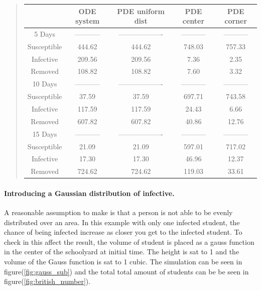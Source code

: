 \documentclass[%
twoside,                 %
final,                   %
10pt]{article}
\begin{document}
\begin{quote}
\begin{tabular}{ccccc}
\hline
\multicolumn{1}{c}{  } & \multicolumn{1}{c}{ ODE system } & \multicolumn{1}{c}{ PDE uniform dist } & \multicolumn{1}{c}{ PDE center } & \multicolumn{1}{c}{ PDE corner } \\
\hline
5 Days              & -----------         & ------------------- & -----------         & -----------         \\
\hline
Susceptible         & 444.62              & 444.62              & 748.03              & 757.33              \\
Infective           & 209.56              & 209.56              & 7.36                & 2.35                \\
Removed             & 108.82              & 108.82              & 7.60                & 3.32                \\
\hline
10 Days             & -----------         & ------------------- & -----------         & -----------         \\
\hline
Susceptible         & 37.59               & 37.59               & 697.71              & 743.58              \\
Infective           & 117.59              & 117.59              & 24.43               & 6.66                \\
Removed             & 607.82              & 607.82              & 40.86               & 12.76               \\
\hline
15 Days             & -----------         & ------------------- & -----------         & -----------         \\
\hline
Susceptible         & 21.09               & 21.09               & 597.01              & 717.02              \\
Infective           & 17.30               & 17.30               & 46.96               & 12.37               \\
Removed             & 724.62              & 724.62              & 119.03              & 33.61               \\
\hline
\end{tabular}
\end{quote}

\noindent

\paragraph{Introducing a Gaussian distribution of infective.}
A reasonable assumption to make is that a person is not able to be evenly distributed over an area. In this example with only one infected student, the chance of being infected increase as closer you get to the infected student. To check in this affect the result, the volume of student is placed as a gauss function in the center of the schoolyard at initial time. The height is sat to 1 and the volume of the Gauss function is sat to 1 cubic. The simulation can be seen in figure(\ref{fig:gauss_sub}) and the total total amount of students can be be seen in figure(\ref{fig:british_number}).
\end{document}
